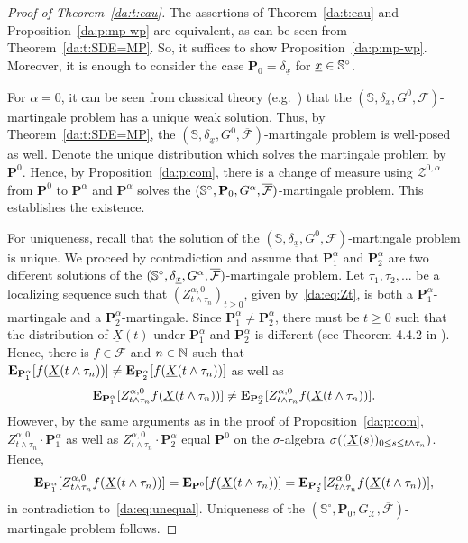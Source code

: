 \begin{proof}[Proof of Theorem~\ref{da:t:eau}]
The assertions of Theorem~\ref{da:t:eau} and Pro\-position~\ref{da:p:mp-wp} are
equivalent, as can be seen from Theorem~\ref{da:t:SDE=MP}. So, it
suffices to show Proposition~\ref{da:p:mp-wp}. Moreover, it is enough to
consider the case $\mathbf P_0 = \delta_{\underline x}$ for
$\underline x\in \mathbb{S}^\circ$.

For $\alpha=0$, it can be seen from classical theory
(e.g.~\citealp[Theorem 5.4.1]{hennequin_measure-valued_1993}) that the 
$(\mathbb S,\delta_{\underline x}, G^0, {\mathcal F})$-martingale
problem has a unique weak solution. Thus, by Theorem~\ref{da:t:SDE=MP}, the 
$(\mathbb S,\delta_{\underline x}, G^0, \overline {\mathcal F})$-martingale 
problem is well-posed as well. Denote the unique distribution which solves 
the martingale problem by $\mathbf P^0$. Hence, by Proposition~\ref{da:p:com}, 
there is a change of measure using $\mathcal Z^{0,\alpha}$ from $\mathbf P^0$ 
to $\mathbf P^\alpha$ and $\mathbf P^\alpha$ solves the $(\mathbb S^\circ, \mathbf P_0, G^{\alpha},
\overline{\mathcal F})$-martingale problem. This establishes the existence.

For uniqueness, recall that the solution of the 
$(\mathbb S,\delta_{\underline x}, G^0, {\mathcal F})$-martingale
problem is unique. We proceed by contradiction and assume that
$\mathbf P_1^\alpha$ and $\mathbf P_2^\alpha$ are two different
solutions of the $(\mathbb{S}^\circ, \delta_{\underline x},G^{\alpha}, \overline{\mathcal F})$-martingale
problem. Let $\tau_1, \tau_2,...$ be a localizing sequence such that
$(Z^{\alpha,0}_{t\wedge \tau_n})_{t\geq 0}$, given by~\eqref{da:eq:Zt}, is both a 
$\mathbf P_1^\alpha$-martingale and a $\mathbf P_2^\alpha$-martingale. Since
$\mathbf P_1^\alpha \neq \mathbf P_2^\alpha$, there must be $t\geq 0$ such that the distribution of
$\underline X(t)$ under $\mathbf P_1^\alpha$ and $\mathbf P_2^\alpha$ is different (see Theorem 4.4.2
in \cite{ethier_markov_2005}). Hence, there is $f\in{\mathcal F}$
and $n\in\mathbb{N}$ such that $\mathbf E_{\mathbf P_1^\alpha}[f(\underline{X} \! \left( t\wedge \tau_n \right))] \neq \mathbf
E_{\mathbf P_2^\alpha}[f(\underline{X} \! \left( t\wedge \tau_n \right))]$ as well as
  \begin{align}
    \label{da:eq:unequal}
    \mathbf E_{\mathbf P_1^\alpha}[Z_{t\wedge
      \tau_n}^{\alpha,0}f(\underline{X} \! \left( t\wedge \tau_n \right))] \neq \mathbf
    E_{\mathbf P_2^\alpha}[Z_{t\wedge \tau_n}^{\alpha,0}f(\underline{X} \! \left( t\wedge \tau_n \right))].
  \end{align}
  However, by the same arguments as in the proof of
  Proposition~\ref{da:p:com}, $Z_{t\wedge \tau_n}^{\alpha,0} \cdot \mathbf
  P_1^\alpha$ as well as $Z_{t\wedge \tau_n}^{\alpha,0} \cdot \mathbf
  P_2^\alpha$ equal $\mathbf P^0$ on the $\sigma$-algebra
  $\sigma((\underline{X} \! \left( s \right))_{0\leq s\leq t\wedge \tau_n})$. Hence,
  $$\mathbf E_{\mathbf P_1^\alpha}[Z_{t\wedge
    \tau_n}^{\alpha,0}f(\underline{X} \! \left( t\wedge \tau_n \right))] = \mathbf
  E_{\mathbf P^0}[f(\underline{X} \! \left( t\wedge \tau_n \right))] = \mathbf
  E_{\mathbf P_2^\alpha}[Z_{t\wedge \tau_n}^{\alpha,0}f(\underline{X} \! \left( t\wedge \tau_n \right))],$$ in contradiction
  to~\eqref{da:eq:unequal}. Uniqueness of the $(\mathbb S^\circ, \mathbf
  P_0, G_{\mathcal X}, \overline{\mathcal F})$-martingale problem
  follows.
\end{proof}